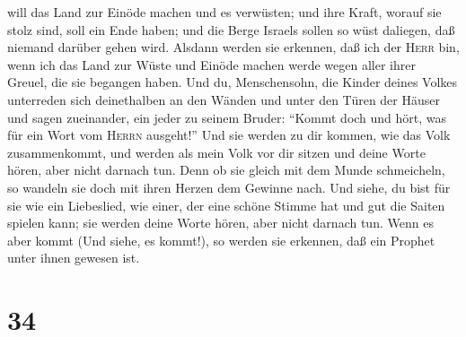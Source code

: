 will das Land zur Einöde machen und es verwüsten; und ihre Kraft, worauf
sie stolz sind, soll ein Ende haben; und die Berge Israels sollen so
wüst daliegen, daß niemand darüber gehen wird.  Alsdann
werden sie erkennen, daß ich der \textsc{Herr} bin, wenn ich das Land
zur Wüste und Einöde machen werde wegen aller ihrer Greuel, die sie
begangen haben.  Und du, Menschensohn, die Kinder deines
Volkes unterreden sich deinethalben an den Wänden und unter den Türen
der Häuser und sagen zueinander, ein jeder zu seinem Bruder: ``Kommt
doch und hört, was für ein Wort vom \textsc{Herrn} ausgeht!''
 Und sie werden zu dir kommen, wie das Volk
zusammenkommt, und werden als mein Volk vor dir sitzen und deine Worte
hören, aber nicht darnach tun. Denn ob sie gleich mit dem Munde
schmeicheln, so wandeln sie doch mit ihren Herzen dem Gewinne nach.
 Und siehe, du bist für sie wie ein Liebeslied, wie
einer, der eine schöne Stimme hat und gut die Saiten spielen kann; sie
werden deine Worte hören, aber nicht darnach tun.  Wenn
es aber kommt (Und siehe, es kommt!), so werden sie erkennen, daß ein
Prophet unter ihnen gewesen ist.

\hypertarget{section-33}{%
\section{34}\label{section-33}}

